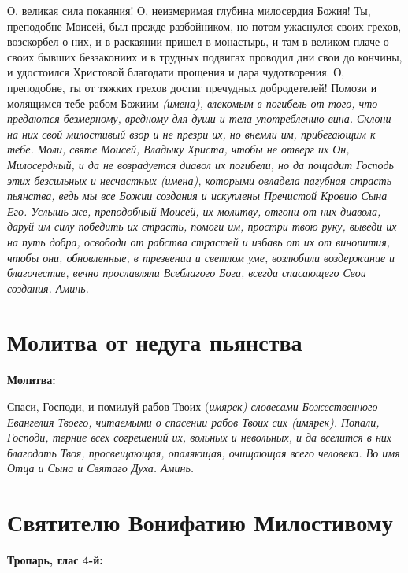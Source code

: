 О, великая сила покаяния! О, неизмеримая глубина милосердия Божия! Ты, преподобне Моисей, был прежде разбойником, но потом ужаснулся своих грехов, возскорбел о них, и в раскаянии пришел в монастырь, и там в великом плаче о своих бывших беззакониих и в трудных подвигах проводил дни свои до кончины, и удостоился Христовой благодати прощения и дара чудотворения. О, преподобне, ты от тяжких грехов достиг пречудных добродетелей! Помози и молящимся тебе рабом Божиим \itshape (имена),\normalfont{} влекомым в погибель от того, что предаются безмерному, вредному для души и тела употреблению вина. Склони на них свой милостивый взор и не презри их, но внемли им, прибегающим к тебе. Моли, святе Моисей, Владыку Христа, чтобы не отверг их Он, Милосердный, и да не возрадуется диавол их погибели, но да пощадит Господь этих безсильных и несчастных \itshape (имена),\normalfont{} которыми овладела пагубная страсть пьянства, ведь мы все Божии создания и искуплены Пречистой Кровию Сына Его. Услышь же, преподобный Моисей, их молитву, отгони от них диавола, даруй им силу победить их страсть, помоги им, простри твою руку, выведи их на путь добра, освободи от рабства страстей и избавь от их от винопития, чтобы они, обновленные, в трезвении и светлом уме, возлюбили  воздержание и благочестие, вечно прославляли Всеблагого Бога, всегда спасающего Свои создания. Аминь.


\section{Молитва от недуга пьянства}
 


\bfseries Молитва:\normalfont{}


Спаси, Господи, и помилуй рабов Твоих (\itshape имярек\normalfont{}) словесами Божественного Евангелия Твоего, читаемыми о спасении рабов Твоих сих (\itshape имярек\normalfont{}). Попали, Господи, терние всех согрешений их, вольных и невольных, и да вселится в них благодать Твоя, просвещающая, опаляющая, очищающая всего человека. Во имя Отца и Сына и Святаго Духа. Аминь.


\section{Святителю Вонифатию Милостивому}
 


\bfseries Тропарь, глас 4-й:\normalfont{}


